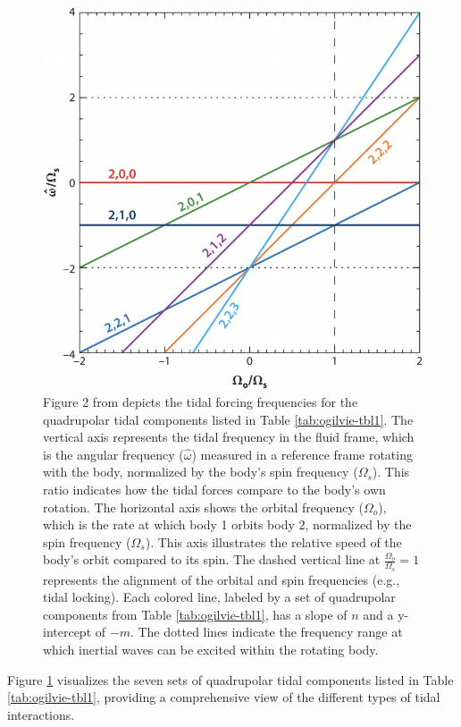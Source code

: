 \documentclass[oneside,12pt]{amsart}
\numberwithin{page}{section}
\begin{document}
\begin{figure}[htbp]
    \centering
    \includegraphics[width=0.7\linewidth]{figs/ogilvie_fig2.png}
    \caption{Figure 2 from \citet{ogilvie2014tidal} depicts the tidal forcing frequencies for the quadrupolar tidal components listed in Table \ref{tab:ogilvie-tbl1}. The vertical axis represents the tidal frequency in the fluid frame, which is the angular frequency ($\hat{\omega}$) measured in a reference frame rotating with the body, normalized by the body’s spin frequency ($\Omega_s$). This ratio indicates how the tidal forces compare to the body’s own rotation. The horizontal axis shows the orbital frequency ($\Omega_o$), which is the rate at which body 1 orbits body 2, normalized by the spin frequency ($\Omega_s$). This axis illustrates the relative speed of the body’s orbit compared to its spin. The dashed vertical line at $\frac{\Omega_o}{\Omega_s} = 1$ represents the alignment of the orbital and spin frequencies (e.g., tidal locking). Each colored line, labeled by a set of quadrupolar components from Table \ref{tab:ogilvie-tbl1}, has a slope of $n$ and a y-intercept of $-m$. The dotted lines indicate the frequency range at which inertial waves can be excited within the rotating body.}
    \label{fig:ogilvie-fig2}
\end{figure}

Figure \ref{fig:ogilvie-fig2} visualizes the seven sets of quadrupolar tidal components listed in Table \ref{tab:ogilvie-tbl1}, providing a comprehensive view of the different types of tidal interactions.
\end{document}
